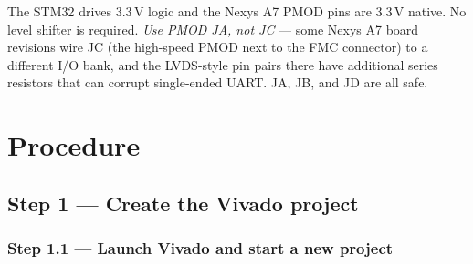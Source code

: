 \documentclass[11pt,letterpaper]{article}
\begin{document}

\begin{tcolorbox}[warning={Voltage Levels and Connector Choice}]
	The STM32 drives 3.3\,V logic and the Nexys A7 PMOD pins are 3.3\,V native. No level shifter is required. \emph{Use PMOD JA, not JC} --- some Nexys A7 board revisions wire JC (the high-speed PMOD next to the FMC connector) to a different I/O bank, and the LVDS-style pin pairs there have additional series resistors that can corrupt single-ended UART. JA, JB, and JD are all safe.
\end{tcolorbox}

\newpage
\section{Procedure}

\subsection{Step 1 --- Create the Vivado project}

\subsubsection*{Step 1.1 --- Launch Vivado and start a new project}
\end{document}
